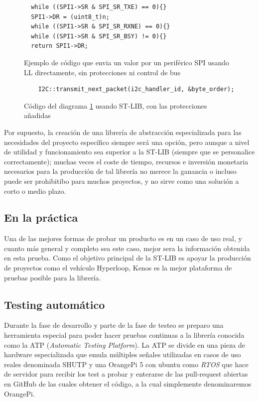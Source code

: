 \documentclass{report}
\begin{document}
\begin{figure}[h]
\begin{lstlisting}
  while ((SPI1->SR & SPI_SR_TXE) == 0){}
  SPI1->DR = (uint8_t)n;
  while ((SPI1->SR & SPI_SR_RXNE) == 0){}
  while ((SPI1->SR & SPI_SR_BSY) != 0){}
  return SPI1->DR;

  \end{lstlisting}
  \caption{Ejemplo de código que envia un valor por un periférico SPI usando LL directamente, sin protecciones ni control de bus}
  \label{LLSPICode}
\end{figure}

\begin{figure}[h]
  \begin{lstlisting}
    I2C::transmit_next_packet(i2c_handler_id, &byte_order);
    \end{lstlisting}
    \caption{Código del diagrama \ref{LLSPICode} usando ST-LIB, con las protecciones añadidas}
    \label{STLIBSPICode}
  \end{figure}
\par \vspace{0.3cm}

Por supuesto, la creación de una librería de abstracción especializada para las necesidades del proyecto específico siempre será una opción, pero aunque a nivel de utilidad y funcionamiento sea superior a la ST-LIB (siempre que se personalice correctamente); muchas veces el coste de tiempo, recursos e inversión monetaria necesarios para la producción de tal librería no merece la ganancia o incluso puede ser prohibitibo para muchos proyectos, y no sirve como una solución a corto o medio plazo. 

\subsection{En la práctica}
Una de las mejores formas de probar un producto es en un caso de uso real, y cuanto más general y completo sea este caso, mejor sera la información obtenida en esta prueba. Como el objetivo principal de la ST-LIB es apoyar la producción de proyectos como el vehículo Hyperloop, Kenos es la mejor plataforma de pruebas posible para la librería. 
\par \vspace{0.3cm}



\subsection{Testing automático}
Durante la fase de desarrollo y parte de la fase de testeo se preparo una herramienta especial para poder hacer pruebas continuas a la librería conocida como la ATP (\textit{Automatic Testing Platform}). La ATP se divide en una pieza de hardware especializada que emula múltiples señales utilizadas en casos de uso reales denominada SHUTP y una OrangePi 5 con ubuntu como \textit{RTOS} que hace de servidor para recibir los test a probar y enterarse de las pull-request abiertas en GitHub de las cuales obtener el código, a la cual simplemente denominaremos OrangePi. \par \vspace{0.3cm}
\end{document}
